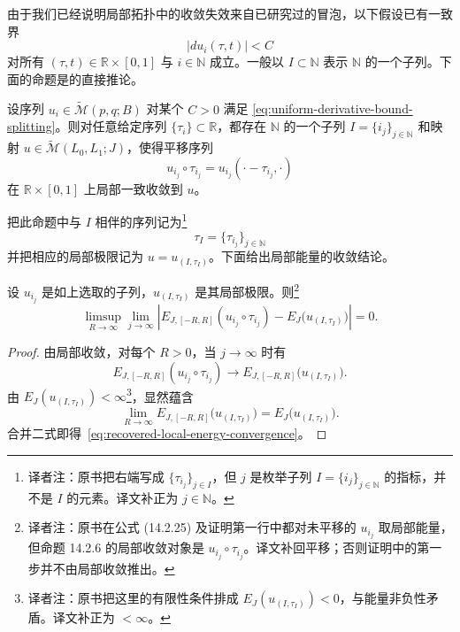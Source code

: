 由于我们已经说明局部拓扑中的收敛失效来自已研究过的冒泡，以下假设已有一致界
\begin{equation}
  |du_i(\tau,t)|<C
\label{eq:uniform-derivative-bound-splitting}
\end{equation}
对所有 $(\tau,t)\in\mathbb R\times[0,1]$ 与 $i\in\mathbb N$ 成立。一般以
$I\subset\mathbb N$ 表示 $\mathbb N$ 的一个子列。下面的命题是\termAscoliArzelaTheorem{}的直接推论。

\begin{proposition}
\label{prop:translated-local-subsequence}
设序列 $u_i\in\widetilde{\mathcal M}(p,q;B)$ 对某个 $C>0$ 满足
\eqref{eq:uniform-derivative-bound-splitting}。则对任意给定序列
$\{\tau_i\}\subset\mathbb R$，都存在 $\mathbb N$ 的一个子列
$I=\{i_j\}_{j\in\mathbb N}$ 和映射
$u\in\widetilde{\mathcal M}(L_0,L_1;J)$，使得平移序列
\[
  u_{i_j}\circ\tau_{i_j}
  =u_{i_j}(\mathord\cdot-\tau_{i_j},\mathord\cdot)
\]
在 $\mathbb R\times[0,1]$ 上局部一致收敛到 $u$。
\end{proposition}

把此命题中与 $I$ 相伴的序列记为\footnote{译者注：原书把右端写成
$\{\tau_{i_j}\}_{j\in I}$，但 $j$ 是枚举子列
$I=\{i_j\}_{j\in\mathbb N}$ 的指标，并不是 $I$ 的元素。译文补正为
$j\in\mathbb N$。}
\[
  \tau_I=\{\tau_{i_j}\}_{j\in\mathbb N}
\]
并把相应的局部极限记为 $u=u_{(I,\tau_I)}$。下面给出局部能量的收敛结论。

\begin{proposition}
\label{prop:local-energy-of-recovered-limit}
设 $u_{i_j}$ 是如上选取的子列，$u_{(I,\tau_I)}$ 是其局部极限。则\footnote{译者注：原书在公式 (14.2.25) 及证明第一行中都对未平移的 $u_{i_j}$
取局部能量，但命题 14.2.6 的局部收敛对象是
$u_{i_j}\circ\tau_{i_j}$。译文补回平移；否则证明中的第一步并不由局部收敛推出。}
\begin{equation}
  \limsup_{R\to\infty}\lim_{j\to\infty}
  \left|
    E_{J,[-R,R]}(u_{i_j}\circ\tau_{i_j})
    -E_J\bigl(u_{(I,\tau_I)}\bigr)
  \right|
  =0.
\label{eq:recovered-local-energy-convergence}
\end{equation}
\end{proposition}

\begin{proof}
由局部收敛，对每个 $R>0$，当 $j\to\infty$ 时有
\[
  E_{J,[-R,R]}(u_{i_j}\circ\tau_{i_j})
  \longrightarrow
  E_{J,[-R,R]}\bigl(u_{(I,\tau_I)}\bigr).
\]
由 $E_J(u_{(I,\tau_I)})<\infty$\footnote{译者注：原书把这里的有限性条件排成
$E_J(u_{(I,\tau_I)})<0$，与能量非负性矛盾。译文补正为 $<\infty$。}，\termLebesgueDominatedConvergenceTheorem{}显然蕴含
\[
  \lim_{R\to\infty}
  E_{J,[-R,R]}\bigl(u_{(I,\tau_I)}\bigr)
  =E_J\bigl(u_{(I,\tau_I)}\bigr).
\]
合并二式即得~\eqref{eq:recovered-local-energy-convergence}。
\end{proof}

